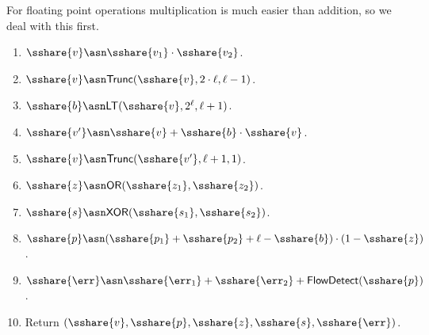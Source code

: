 For floating point operations multiplication is much easier than addition, so we deal with
this first.
\begin{enumerate}
  \item $\sshare{v} \asn \sshare{v_1} \cdot \sshare{v_2}$.
  \item $\sshare{v} \asn \mathsf{Trunc}(\sshare{v},2 \cdot \ell, \ell-1)$.
  \item $\sshare{b} \asn \mathsf{LT}(\sshare{v},2^\ell,\ell+1)$.
  \item $\sshare{v'} \asn \sshare{v}+\sshare{b} \cdot \sshare{v}$.
  \item $\sshare{v} \asn \mathsf{Trunc}(\sshare{v'}, \ell+1, 1)$.
  \item $\sshare{z} \asn \mathsf{OR}(\sshare{z_1},\sshare{z_2})$.
  \item $\sshare{s} \asn \mathsf{XOR}(\sshare{s_1},\sshare{s_2})$.
  \item $\sshare{p} \asn (\sshare{p_1}+\sshare{p_2}+\ell-\sshare{b}) \cdot (1-\sshare{z})$.
  \item $\sshare{\err} \asn \sshare{\err_1} + \sshare{\err_2} + \mathsf{FlowDetect}(\sshare{p})$.
  \item Return $(\sshare{v},\sshare{p},\sshare{z},\sshare{s},\sshare{\err})$.
\end{enumerate}


